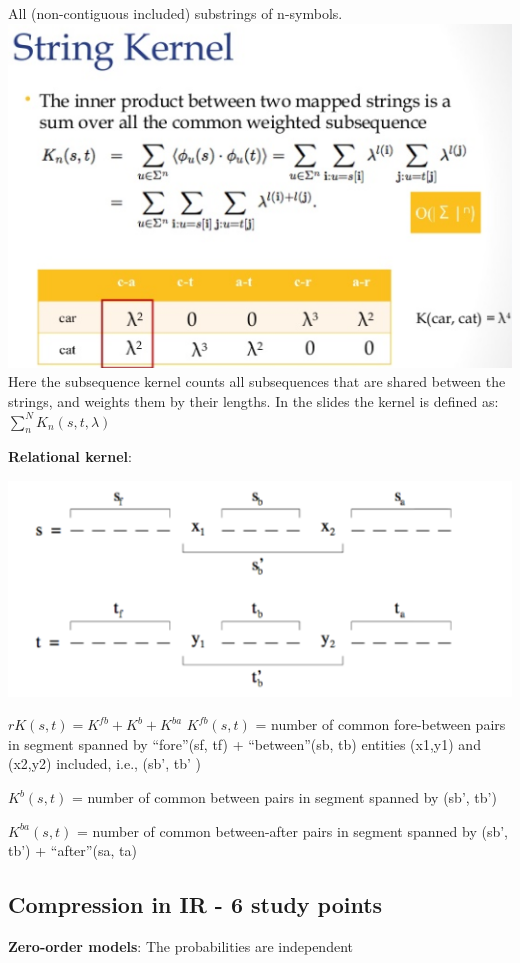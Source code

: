 \documentclass[a4paper,10pt,landscape]{article}
\newcommand{\topic}[1]{\begin{center}\section*{#1}\end{center}}
\begin{document}
\begin{multicols}{3}
 All (non-contiguous included) substrings of n-symbols. 
 \includegraphics[width=\linewidth]{images/stringkernel.png}
 Here the subsequence kernel counts all subsequences that are shared between the strings, and weights them by their lengths. In the slides the kernel is defined as:
 $\sum_n^N K_n(s,t,\lambda)$
 
 \textbf{Relational kernel}:
 
 \includegraphics[width=\linewidth]{images/relationalkernel.png}
 
 $rK(s,t) = K^{fb} +  K^b + K^{ba}$
 $K^{fb}(s,t)$ =  number of common fore-between pairs in segment spanned by “fore”(sf, tf) +  “between”(sb, tb) entities (x1,y1) and (x2,y2) included, i.e., (sb’, tb’ )
 
 $K^{b}(s,t)$ = number of common between pairs in segment spanned by (sb’, tb’) 
 
 $K^{ba}(s,t)$ = number of common between-after pairs in segment spanned by (sb’, tb’) +  “after”(sa, ta)

\topic{Compression in IR - 6 study points}

\textbf{Zero-order models}: The probabilities are independent


\end{multicols}
\end{document}
